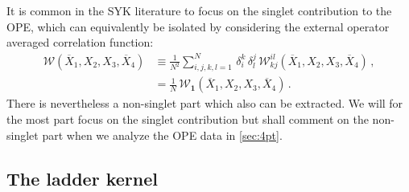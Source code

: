 \documentclass[11pt]{article}
\newcommand{\Xb}{\overline{X}}
\begin{document}
It is common in the SYK literature to focus on the singlet contribution to the OPE, which can equivalently be isolated by considering the external operator averaged correlation function: 
%
\begin{equation}\label{eq:Wsingletav}
\begin{split}
\mathcal{W}(\Xb_{1},X_{2},X_{3},\Xb_{4})  
&\equiv
  \frac{1}{N^2} \sum_{i,j,k,l=1}^N\, \delta^k_i\, \delta^j_l \, \mathcal{W}^{il}_{kj} (\Xb_{1},X_{2},X_{3},\Xb_{4}) \,,  \\
&= 
  \frac{1}{N}\, \mathcal{W}_\mathbf{1}(\Xb_{1},X_{2},X_{3},\Xb_{4})  \,.
\end{split}
\end{equation}  
%
There is nevertheless a non-singlet part which also can be extracted. We will for the most part focus on the singlet contribution but shall comment on the non-singlet part when we analyze the OPE data in \cref{sec:4pt}.

 

\subsection{The ladder kernel}
\label{sec:ladder}
\end{document}
